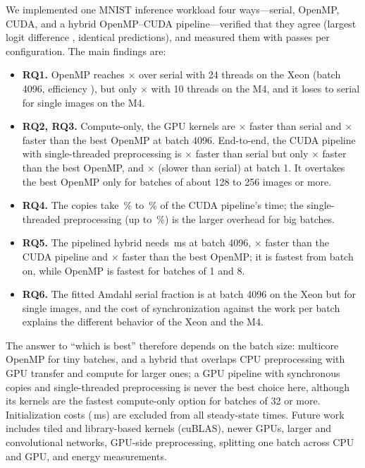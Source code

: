 We implemented one MNIST inference workload four ways---serial, OpenMP, CUDA, and a hybrid OpenMP--CUDA pipeline---verified that they agree (largest logit difference , identical predictions), and measured them with  passes per configuration. The main findings are:

\begin{itemize}
\item \textbf{RQ1.} OpenMP reaches $\times$ over serial with 24 threads on the Xeon (batch 4096, efficiency ), but only $\times$ with 10 threads on the M4, and it loses to serial for single images on the M4.
\item \textbf{RQ2, RQ3.} Compute-only, the GPU kernels are $\times$ faster than serial and $\times$ faster than the best OpenMP at batch 4096. End-to-end, the CUDA pipeline with single-threaded preprocessing is $\times$ faster than serial but only $\times$ faster than the best OpenMP, and $\times$ (slower than serial) at batch 1. It overtakes the best OpenMP only for batches of about 128 to 256 images or more.
\item \textbf{RQ4.} The copies take \,\% to \,\% of the CUDA pipeline's time; the single-threaded preprocessing (up to \,\%) is the larger overhead for big batches.
\item \textbf{RQ5.} The pipelined hybrid needs \,ms at batch 4096, $\times$ faster than the CUDA pipeline and $\times$ faster than the best OpenMP; it is fastest from batch  on, while OpenMP is fastest for batches of 1 and 8.
\item \textbf{RQ6.} The fitted Amdahl serial fraction is  at batch 4096 on the Xeon but  for single images, and the cost of synchronization against the work per batch explains the different behavior of the Xeon and the M4.
\end{itemize}

The answer to ``which is best'' therefore depends on the batch size: multicore OpenMP for tiny batches, and a hybrid that overlaps CPU preprocessing with GPU transfer and compute for larger ones; a GPU pipeline with synchronous copies and single-threaded preprocessing is never the best choice here, although its kernels are the fastest compute-only option for batches of 32 or more. Initialization costs (\,ms) are excluded from all steady-state times. Future work includes tiled and library-based kernels (cuBLAS), newer GPUs, larger and convolutional networks, GPU-side preprocessing, splitting one batch across CPU and GPU, and energy measurements.

